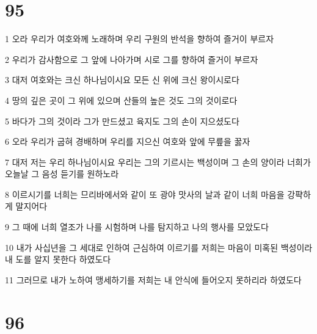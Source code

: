 \chapter{95}

\par 1 오라 우리가 여호와께 노래하며 우리 구원의 반석을 향하여 즐거이 부르자
\par 2 우리가 감사함으로 그 앞에 나아가며 시로 그를 향하여 즐거이 부르자
\par 3 대저 여호와는 크신 하나님이시요 모든 신 위에 크신 왕이시로다
\par 4 땅의 깊은 곳이 그 위에 있으며 산들의 높은 것도 그의 것이로다
\par 5 바다가 그의 것이라 그가 만드셨고 육지도 그의 손이 지으셨도다
\par 6 오라 우리가 굽혀 경배하며 우리를 지으신 여호와 앞에 무릎을 꿇자
\par 7 대저 저는 우리 하나님이시요 우리는 그의 기르시는 백성이며 그 손의 양이라 너희가 오늘날 그 음성 듣기를 원하노라
\par 8 이르시기를 너희는 므리바에서와 같이 또 광야 맛사의 날과 같이 너희 마음을 강퍅하게 말지어다
\par 9 그 때에 너희 열조가 나를 시험하며 나를 탐지하고 나의 행사를 모았도다
\par 10 내가 사십년을 그 세대로 인하여 근심하여 이르기를 저희는 마음이 미혹된 백성이라 내 도를 알지 못한다 하였도다
\par 11 그러므로 내가 노하여 맹세하기를 저희는 내 안식에 들어오지 못하리라 하였도다

\chapter{96}

